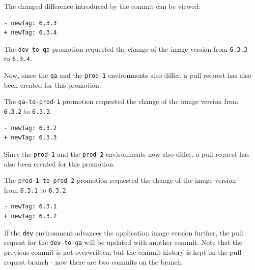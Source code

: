The changed difference introduced by the commit can be viewed:

\begin{lstlisting}
- newTag: 6.3.3
+ newTag: 6.3.4
\end{lstlisting}

The \lstinline|dev-to-qa| promotion requested the change of the image version from
\lstinline|6.3.3| to \lstinline|6.3.4|.

Now, since the \lstinline|qa| and the \lstinline|prod-1| environments
also differ,
a pull request has also been created for this promotion.


The \lstinline|qa-to-prod-1| promotion requested the change of the image version from
\lstinline|6.3.2| to \lstinline|6.3.3|.

\begin{lstlisting}
- newTag: 6.3.2
+ newTag: 6.3.3
\end{lstlisting}

Since the \lstinline|prod-1| and the \lstinline|prod-2| environments
now also differ,
a pull request has also been created for this promotion.


The \lstinline|prod-1-to-prod-2| promotion requested the change of the image version from
\lstinline|6.3.1| to \lstinline|6.3.2|.

\begin{lstlisting}
- newTag: 6.3.1
+ newTag: 6.3.2
\end{lstlisting}

If the \lstinline|dev| environment advances the application image version further,
the pull request for the \lstinline|dev-to-qa| will be updated with another commit.
Note that the previous commit is not overwritten, 
but the commit history is kept on the pull request branch - now there are two commits on the branch.

